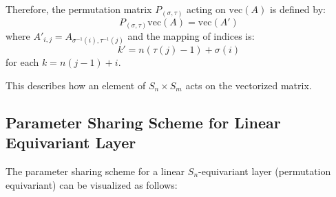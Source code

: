 \documentclass[11pt]{article}
\begin{document}
Therefore, the permutation matrix $P_{(\sigma,\tau)}$ acting on $\mathrm{vec}(A)$ is defined by:
\[
P_{(\sigma,\tau)}\mathrm{vec}(A) = \mathrm{vec}(A')
\]
where $A'_{i,j} = A_{\sigma^{-1}(i),\tau^{-1}(j)}$ and the mapping of indices is:
\[
k' = n(\tau(j)-1) + \sigma(i)
\]
for each $k = n(j-1) + i$.

This describes how an element of $S_n \times S_m$ acts on the vectorized matrix.

\subsection*{Parameter Sharing Scheme for Linear Equivariant Layer}

The parameter sharing scheme for a linear $S_n$-equivariant layer (permutation equivariant) can be visualized as follows:


\begin{center}
\end{center}
\end{document}

